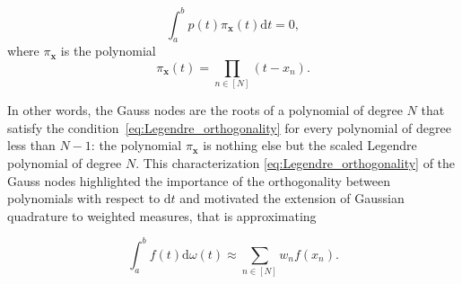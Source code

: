 \documentclass[twoside,11pt]{book}
\numberwithin{theorem}{chapter}
\numberwithin{definition}{chapter}
\numberwithin{proposition}{chapter}
\numberwithin{corollary}{chapter}
\numberwithin{example}{chapter}
\numberwithin{lemma}{chapter}
\numberwithin{assumption}{chapter}
\numberwithin{equation}{chapter}
\numberwithin{figure}{chapter}
\begin{document}
\begin{equation}\label{eq:Legendre_orthogonality}
\int_{a}^{b} p(t) \pi_{\bm{x}}(t) \mathrm{d}t = 0,
\end{equation}
where $\pi_{\bm{x}}$ is the polynomial
\begin{equation}
\pi_{\bm{x}}(t) = \prod\limits_{n \in [N]}(t-x_{n}).
\end{equation}



 In other words, the Gauss nodes are the roots of a polynomial of degree $N$ that satisfy the condition~\eqref{eq:Legendre_orthogonality} for every polynomial of degree less than $N-1$: the polynomial $\pi_{\bm{x}}$ is nothing else but the scaled Legendre polynomial of degree $N$.
 This characterization \eqref{eq:Legendre_orthogonality} of the Gauss nodes highlighted the importance of the orthogonality between polynomials with respect to $\mathrm{d}t$ and motivated the extension of Gaussian quadrature to weighted measures, that is approximating

\begin{equation}
\int_{a}^{b}f(t)\mathrm{d}\omega(t) \approx \sum\limits_{n \in [N]} w_{n}f(x_{n}).
\end{equation}

\end{document}
